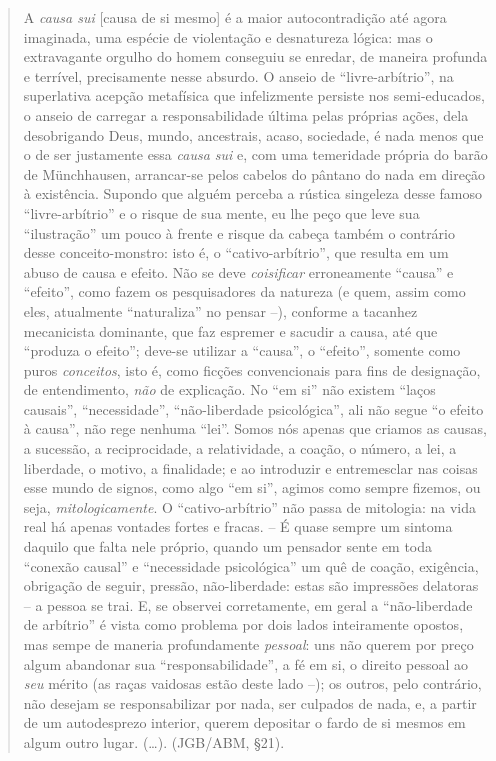\documentclass[
	12pt,				%
	openright,			%
	oneside,			%
	a4paper,			%
	english,			%
	french,				%
	spanish,			%
	brazil				%
	]{abntex2}
\begin{document}
\begin{quotation}
A \textit{causa sui} [causa de si mesmo] é a maior autocontradição até agora imaginada, uma espécie de violentação e desnatureza lógica: mas o extravagante orgulho do homem conseguiu se enredar, de maneira profunda e terrível, precisamente nesse absurdo. O anseio de “livre-arbítrio”, na superlativa acepção metafísica que infelizmente persiste nos semi-educados, o anseio de carregar a responsabilidade última pelas próprias ações, dela desobrigando Deus, mundo, ancestrais, acaso, sociedade, é nada menos que o de ser justamente essa \textit{causa sui} e, com uma temeridade própria do barão de Münchhausen, arrancar-se pelos cabelos do pântano do nada em direção à existência. Supondo que alguém perceba a rústica singeleza desse famoso “livre-arbítrio” e o risque de sua mente, eu lhe peço que leve sua “ilustração” um pouco à frente e risque da cabeça também o contrário desse conceito-monstro: isto é, o “cativo-arbítrio”, que resulta em um abuso de causa e efeito. Não se deve \textit{coisificar} erroneamente “causa” e “efeito”, como fazem os pesquisadores da natureza (e quem, assim como eles, atualmente “naturaliza” no pensar –), conforme a tacanhez mecanicista dominante, que faz espremer e sacudir a causa, até que “produza o efeito”; deve-se utilizar a “causa”, o “efeito”, somente como puros \textit{conceitos}, isto é, como ficções convencionais para fins de designação, de entendimento, \textit{não} de explicação. No “em si” não existem “laços causais”, “necessidade”, “não-liberdade psicológica”, ali não segue “o efeito à causa”, não rege nenhuma “lei”. Somos nós apenas que criamos as causas, a sucessão, a reciprocidade, a relatividade, a coação, o número, a lei, a liberdade, o motivo, a finalidade; e ao introduzir e entremesclar nas coisas esse mundo de signos, como algo “em si”, agimos como sempre fizemos, ou seja, \textit{mitologicamente}. O “cativo-arbítrio” não passa de mitologia: na vida real há apenas vontades fortes e fracas. – É quase sempre um sintoma daquilo que falta nele próprio, quando um pensador sente em toda “conexão causal” e “necessidade psicológica” um quê de coação, exigência, obrigação de seguir, pressão, não-liberdade: estas são impressões delatoras – a pessoa se trai. E, se observei corretamente, em geral a “não-liberdade de arbítrio” é vista como problema por dois lados inteiramente opostos, mas sempe de maneria profundamente \textit{pessoal}: uns não querem por preço algum abandonar sua “responsabilidade”, a fé em si, o direito pessoal ao \textit{seu} mérito (as raças vaidosas estão deste lado –); os outros, pelo contrário, não desejam se responsabilizar por nada, ser culpados de nada, e, a partir de um autodesprezo interior, querem depositar o fardo de si mesmos em algum outro lugar. (…). (JGB/ABM, §21). 
\end{quotation}
\end{document}
